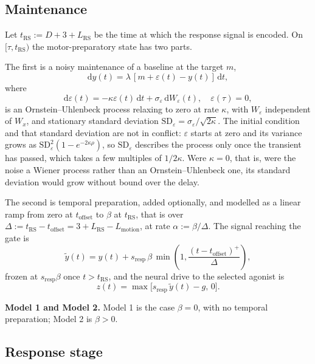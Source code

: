 \documentclass[a4paper,11pt]{article}
\newcommand{\dd}{\mathrm d}
\newcommand{\1}{\mathbbm{1}}
\newcommand{\Lmot}{L_{\mathrm{motion}}}
\newcommand{\Lrs}{L_{\mathrm{RS}}}
\newcommand{\toff}{t_{\mathrm{offset}}}
\newcommand{\trs}{t_{\mathrm{RS}}}
\newcommand{\sresp}{s_{\mathrm{resp}}}
\begin{document}
\subsection{Maintenance}

Let $\trs:=D+3+\Lrs$ be the time at which the response signal is encoded. On
$[\tau,\trs)$ the motor-preparatory state has two parts.

The first is a noisy maintenance of a baseline at the target $m$,
\begin{equation}\label{eq:maint}
\dd y(t)=\lambda\,[m+\varepsilon(t)-y(t)]\,\dd t,
\end{equation}
where
\begin{equation}
\dd\varepsilon(t)=-\kappa\varepsilon(t)\,\dd t+\sigma_\varepsilon\,\dd W_\varepsilon(t),
\quad \varepsilon(\tau)=0,
\end{equation}
is an Ornstein--Uhlenbeck process relaxing to zero at rate $\kappa$, with $W_\varepsilon$
independent of $W_x$, and stationary standard deviation
$\mathrm{SD}_\varepsilon=\sigma_\varepsilon/\sqrt{2\kappa}$. The initial condition and
that standard deviation are not in conflict: $\varepsilon$ starts at zero and its variance
grows as $\mathrm{SD}_\varepsilon^{2}(1-e^{-2\kappa\rho})$, so
$\mathrm{SD}_\varepsilon$ describes the process only once the transient has passed,
which takes a few multiples of $1/2\kappa$. Were $\kappa=0$, that is,
were the noise a Wiener process rather than an Ornstein--Uhlenbeck one, its standard
deviation would grow without bound over the delay.

The second is temporal preparation, added optionally, and modelled as a linear ramp from
zero at $\toff$ to $\beta$ at $\trs$, that is over
$\Delta:=\trs-\toff=3+\Lrs-\Lmot$, at rate $\alpha:=\beta/\Delta$. The signal reaching
the gate is
\begin{equation}
\tilde y(t)=y(t)+\sresp\,\beta\,\min\!\left(1,\frac{(t-\toff)^{+}}{\Delta}\right),
\end{equation}
frozen at $\sresp\beta$ once $t>\trs$, and the neural drive to the selected agonist is
\begin{equation}
z(t)=\max\bigl[\sresp\,\tilde y(t)-g,\,0\bigr].
\label{eq:z}
\end{equation}

\medskip
\noindent\textbf{Model 1 and Model 2.} Model 1 is the case $\beta=0$, with no temporal
preparation; Model 2 is $\beta>0$.

\subsection{Response stage}
\end{document}
